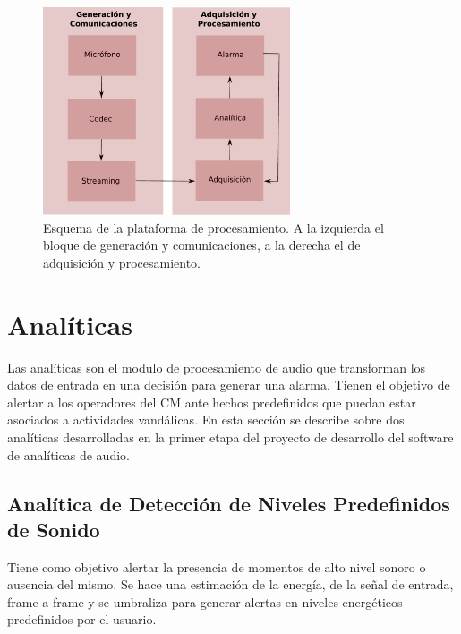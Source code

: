 \documentclass{article}
\begin{document}
\begin{figure}[h]
\begin{center}
\includegraphics[width=0.65\textwidth]{plataforma_procesamiento} 
\caption{Esquema de la plataforma de procesamiento. A la izquierda el bloque de generación y comunicaciones, a la derecha el de adquisición y procesamiento.}
\label{fig:plataforma_procesamiento}
\end{center}
\end{figure}


\section{Analíticas}
\label{analiticas}
Las analíticas son el modulo de procesamiento de audio que transforman los datos de entrada en una decisión para generar una alarma. Tienen el objetivo de alertar a los operadores del CM ante hechos predefinidos que puedan estar asociados a actividades vandálicas. En esta sección se describe sobre dos analíticas desarrolladas en la primer etapa del proyecto de desarrollo del software de analíticas de audio. 

\subsection{Analítica de Detección de Niveles Predefinidos de Sonido}
Tiene como objetivo alertar la presencia de momentos de alto nivel sonoro o ausencia del mismo. Se hace una estimación de la energía, de la señal de entrada, frame a frame y se umbraliza para generar alertas en niveles energéticos predefinidos por el usuario.
\end{document}
